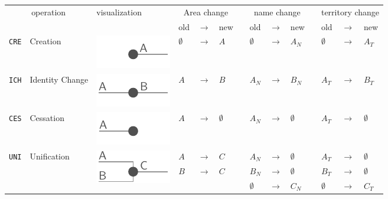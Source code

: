 \begin{table}[!h]
\begin{center}
\begin{tabular}{m{0.65cm} m{2.5cm} m{2.2cm}
                m{0.35cm} m{0.3cm} m{0.35cm} m{0.01cm}
                m{0.35cm} m{0.3cm} m{0.35cm} m{0.01cm}
                m{0.35cm} m{0.3cm} m{0.88cm}}
  \toprule
    \multicolumn{2}{c}{operation}
  & visualization
  & \multicolumn{3}{c}{Area change} &
  & \multicolumn{3}{c}{name change} &
  & \multicolumn{3}{c}{territory change} \\
  & & &
  old & $ \rightarrow $ & new & &
  old & $ \rightarrow $ & new & &
  old & $ \rightarrow $ & new \\

  \midrule
  \texttt{CRE} & Creation & \includegraphics{graphics/concept/operations/CRE} &
  $ \emptyset $ & $ \rightarrow $ & $ A $ & &
  $ \emptyset $ & $ \rightarrow $ & $ A_N $ & &
  $ \emptyset $ & $ \rightarrow $ & $ A_T $ \\

  \midrule
  \texttt{ICH} & Identity Change & \includegraphics{graphics/concept/operations/ICH} &
  $ A   $ & $ \rightarrow $ & $ B $ & &
  $ A_N $ & $ \rightarrow $ & $ B_N $ & &
  $ A_T $ & $ \rightarrow $ & $ B_T $ \\

  \midrule
  \texttt{CES} & Cessation & \includegraphics{graphics/concept/operations/CES} &
  $ A $ & $ \rightarrow $ & $ \emptyset $ & &
  $ A_N $ & $ \rightarrow $ & $ \emptyset $ & &
  $ A_T $ & $ \rightarrow $ & $ \emptyset $ \\

  \midrule
  \multirow{3}{*}{\texttt{UNI}} &
  \multirow{3}{*}{Unification} &
  \multirow{3}{*}{\includegraphics{graphics/concept/operations/UNI}} &
  $ A $ & $ \rightarrow $ & $ C $ & &
  $ A_N $ & $ \rightarrow $ & $ \emptyset $ & &
  $ A_T $ & $ \rightarrow $ & $ \emptyset $ \\
  & & &
  $ B $ & $ \rightarrow $ & $ C $ & &
  $ B_N $ & $ \rightarrow $ & $ \emptyset $ & &
  $ B_T $ & $ \rightarrow $ & $ \emptyset $ \\
  & & &
  & & & &
  $ \emptyset $ & $ \rightarrow $ & $ C_N $ & &
  $ \emptyset $ & $ \rightarrow $ & $ C_T $ \footnotemark \\


\end{tabular}
\end{center}
\end{table}
